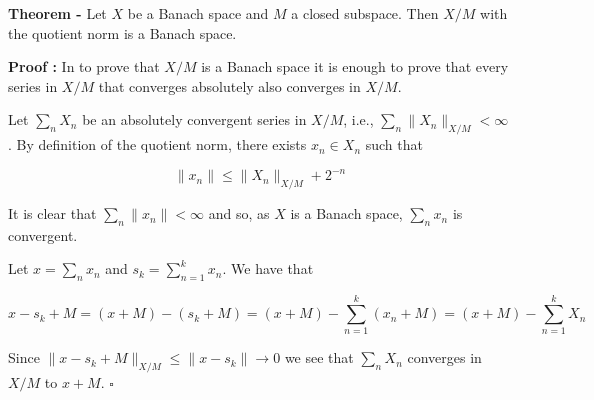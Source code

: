 \documentclass[12pt]{article}
\begin{document}
{\bf Theorem -} Let $X$ be a Banach space and $M$ a closed subspace. Then $X/M$ with the quotient norm is a
 Banach space.

{\bf Proof :} In {} to prove that $X/M$ is a Banach space it is enough to prove that every series in $X/M$
 that converges absolutely also converges in $X/M$.

Let $\sum_{n} X_n$ be an absolutely convergent series in $X/M$, i.e., $\sum_{n} \|X_n\|_{X/M} < \infty$.
By definition of the quotient norm, there exists $x_n \in X_n$ such that

\begin{displaymath}
\|x_n \| \le \|X_n \|_{X/M} + 2^{-n}
\end{displaymath}

It is clear that $\sum_{n} \|x_n\| < \infty$ and so, as $X$ is a Banach space, $\sum_{n} x_n$ is
 convergent.

Let $x = \sum_{n} x_n$ and $s_k = \sum_{n=1}^k x_n$. We have that

\begin{displaymath}
x - s_k + M = (x+M) - (s_k +M) = (x+M) - \sum_{n=1}^k (x_n +M) = (x+M) - \sum_{n=1}^k X_n
\end{displaymath}

Since $\|x-s_k + M \|_{X/M} \leq \|x-s_k\| \longrightarrow 0$ we see that $\sum_n X_n$ converges in $X/M$
 to $x+M$. $\square$
\end{document}

